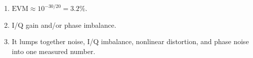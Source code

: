 \begin{enumerate}[leftmargin=1.6em,itemsep=2pt]
\item $\text{EVM} \approx 10^{-30/20} = 3.2\%$.
\item I/Q gain and/or phase imbalance.
\item It lumps together noise, I/Q imbalance, nonlinear distortion, and phase noise into one measured number.
\end{enumerate}
